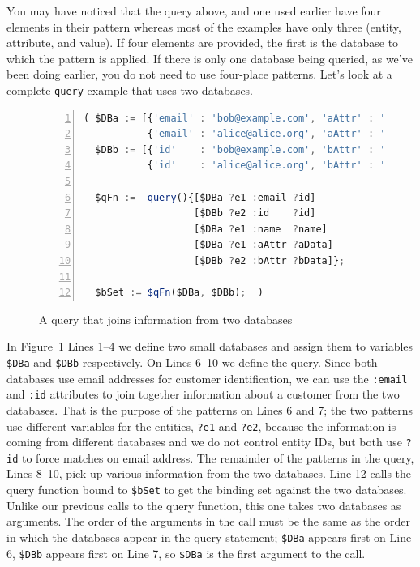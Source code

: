 \documentclass[10pt,letterpaper]{article} %
\newcommand{\stt}[1]{\texttt{#1}} %
\begin{document}
You may have noticed that the query above, and one used earlier have four elements in their pattern whereas most of the examples have only three (entity, attribute, and value).
If four elements are provided, the first is the database to which the pattern is applied.
If there is only one database being queried, as we've been doing earlier, you do not need to use four-place patterns.
Let's look at a complete \stt{query} example that uses two databases.

\begin{figure}[H]
    \caption{A query that joins information from two databases}
    \label{code:two-database-query}
\begin{lstlisting}[language=JavaScript,numberstyle=\scriptsize,basicstyle=\ttfamily\scriptsize,numbers=left,stepnumber=1,breaklines=true]
( $DBa := [{'email' : 'bob@example.com', 'aAttr' : 'Bob-A-data',   'name' : 'Bob'},
           {'email' : 'alice@alice.org', 'aAttr' : 'Alice-A-data', 'name' : 'Alice'}];
  $DBb := [{'id'    : 'bob@example.com', 'bAttr' : 'Bob-B-data'},
           {'id'    : 'alice@alice.org', 'bAttr' : 'Alice-B-data'}];

  $qFn :=  query(){[$DBa ?e1 :email ?id]
                   [$DBb ?e2 :id    ?id]
                   [$DBa ?e1 :name  ?name]
                   [$DBa ?e1 :aAttr ?aData]
                   [$DBb ?e2 :bAttr ?bData]};

  $bSet := $qFn($DBa, $DBb);  )
\end{lstlisting}
  \end{figure} \vspace{-2em}

  In Figure~\ref{code:two-database-query} Lines 1--4 we define two small databases and assign them to variables \stt{\$DBa} and \stt{\$DBb} respectively. On Lines 6--10 we define the query.
Since both databases use email addresses for customer identification, we can use the \stt{:email} and \stt{:id} attributes to join together information about a customer from the two databases.
That is the purpose of the patterns on Lines 6 and 7; the two patterns use different variables for the entities, \stt{?e1} and \stt{?e2},
because the information is coming from different databases and we do not control entity IDs, but both use \stt{?id} to force
matches on email address.
The remainder of the patterns in the query, Lines 8--10, pick up various information from the two databases.
Line 12 calls the query function bound to \stt{\$bSet} to get the binding set against the two databases.
Unlike our previous calls to the query function, this one takes two databases as arguments.
The order of the arguments in the call must be the same as the order in which the databases appear in the query statement;
\stt{\$DBa} appears first on Line 6, \stt{\$DBb} appears first on Line 7, so \stt{\$DBa} is the first argument to the call.
\end{document}
